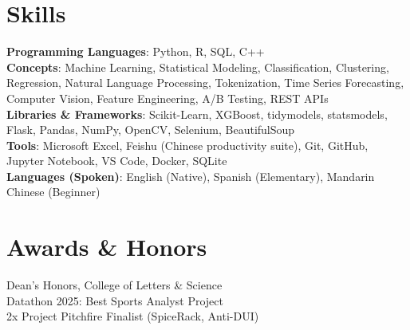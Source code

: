 \documentclass[letterpaper,10pt]{article}
\begin{document}
\section{Skills}
 \begin{itemize}[leftmargin=0.15in, label={}]
    \small{\item{
     \textbf{Programming Languages}{: Python, R, SQL, C++} \\
     \textbf{Concepts}{: Machine Learning, Statistical Modeling, Classification, Clustering, Regression, Natural Language Processing, Tokenization, Time Series Forecasting, Computer Vision, Feature Engineering, A/B Testing, REST APIs} \\
     \textbf{Libraries \& Frameworks}{: Scikit-Learn, XGBoost, tidymodels, statsmodels, Flask, Pandas, NumPy, OpenCV, Selenium, BeautifulSoup} \\
     \textbf{Tools}{: Microsoft Excel, Feishu (Chinese productivity suite), Git, GitHub, Jupyter Notebook, VS Code, Docker, SQLite}\\     
     \textbf{Languages (Spoken)}{: English (Native), Spanish (Elementary), Mandarin Chinese (Beginner)}
    }}
 \end{itemize}

\section{Awards \& Honors}
 \begin{itemize}[leftmargin=0.15in, label={}]
    \small{\item{
     Dean's Honors, College of Letters \& Science \\
     Datathon 2025: Best Sports Analyst Project \\
     2x Project Pitchfire Finalist (SpiceRack, Anti-DUI)
    }}
 \end{itemize}
\end{document}
